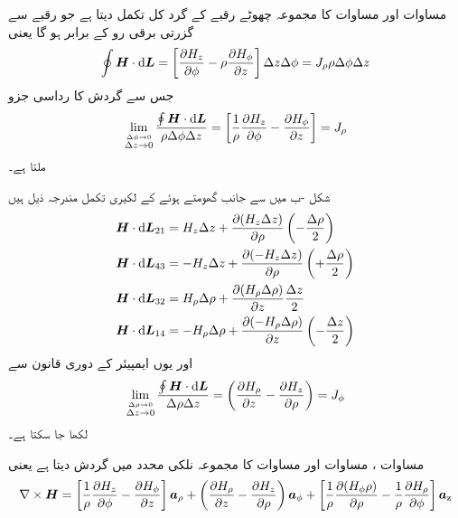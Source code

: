 مساوات  اور مساوات  کا مجموعہ چھوٹے رقبے کے گرد کل تکمل دیتا ہے جو رقبے سے گزرتی برقی رو  کے برابر ہو گا یعنی
\begin{align*}
\oint \kvec{H} \cdot \dif \kvec{L}=\left[ \frac{\partial H_z}{\partial \phi}-\rho\frac{\partial H_{\phi}}{\partial z} \right]\Delta z\Delta \phi=J_{\rho} \rho \Delta \phi \Delta z
\end{align*}
جس سے گردش کا رداسی جزو
\begin{align}\label{مساوات_مقناطیسی_رداسی_نلکی_گردش}
\lim_{\overset{\Delta \phi \to 0}{\Delta z \to 0}}\frac{\oint \kvec{H} \cdot \dif \kvec{L}}{\rho \Delta \phi \Delta z}=\left[\frac{1}{\rho}\frac{\partial H_z}{\partial \phi} -\frac{\partial H_{\phi}}{\partial z}\right]=J_{\rho}
\end{align}
ملتا ہے۔

شکل -ب میں  سے  جانب گھومتے ہوئے   کے لکیری تکمل مندرجہ ذیل ہیں
\begin{align*}
\kvec{H} \cdot \dif \kvec{L}_{21}&=H_z \Delta z+\frac{\partial (H_z \Delta z)}{\partial \rho}\left(-\frac{\Delta \rho}{2}\right)\\
\kvec{H} \cdot \dif \kvec{L}_{43}&=-H_z \Delta z+\frac{\partial (-H_z \Delta z)}{\partial \rho}\left(+\frac{\Delta \rho}{2}\right)\\
\kvec{H} \cdot \dif \kvec{L}_{32}&=H_{\rho}\Delta \rho+\frac{\partial (H_{\rho}\Delta \rho)}{\partial  z}\frac{\Delta z}{2}\\
\kvec{H} \cdot \dif \kvec{L}_{14}&=-H_{\rho}\Delta \rho+\frac{\partial (-H_{\rho}\Delta \rho)}{\partial z}\left(-\frac{\Delta z}{2}\right)
\end{align*}
اور یوں ایمپیئر کے دوری قانون سے
\begin{align}\label{مساوات_مقناطیسی_زاویائی_نلکی_گردش}
\lim_{\overset{\Delta \rho \to 0}{\Delta z \to 0}}\frac{\oint \kvec{H} \cdot \dif \kvec{L}}{\Delta \rho \Delta z}=\left(\frac{\partial H_\rho}{\partial z}-\frac{\partial H_z}{\partial \rho} \right)=J_{\phi}
\end{align}
لکھا جا سکتا ہے۔

مساوات ، مساوات  اور مساوات  کا مجموعہ نلکی محدد میں گردش دیتا ہے یعنی
\begin{align}\label{مساوات_مقناطیسی_نلکی_محدد_میں_گردش}
\nabla \times {\ensuremath{{\boldsymbol{H}}}}=\left[\frac{1}{\rho}\frac{\partial H_z}{\partial \phi} -\frac{\partial H_{\phi}}{\partial z}\right]{\boldsymbol{a}}_{\rho}+\left(\frac{\partial H_\rho}{\partial z}-\frac{\partial H_z}{\partial \rho} \right){\boldsymbol{a}}_{\phi}+\left[\frac{1}{\rho}\frac{\partial (H_{\phi}\rho )}{\partial \rho}-\frac{1}{\rho}\frac{\partial H_{\rho}}{\partial \phi}\right]{\boldsymbol{a}}_{\textup{z}}
\end{align}

